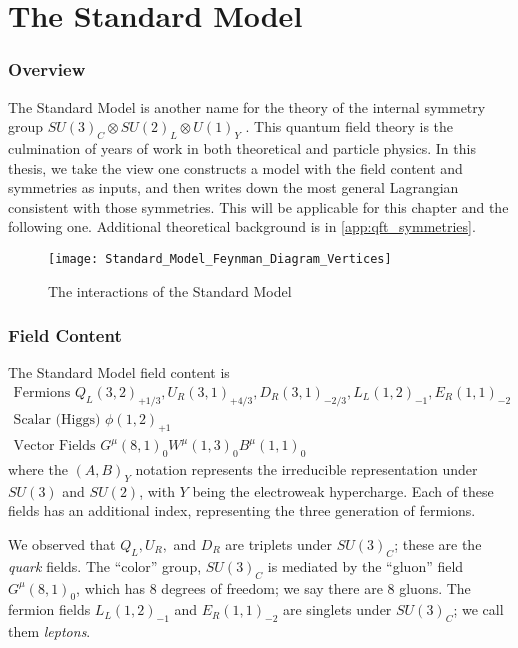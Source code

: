 \chapter{The Standard Model}

\subsection{Overview}


The Standard Model is another name for the theory of the internal symmetry group $SU(3)_C \otimes SU(2)_L \otimes U(1)_Y$ .
This quantum field theory is the culmination of years of work in both theoretical and particle physics.  
In this thesis, we take the view one constructs a model with the field content and symmetries as inputs, and then writes down the most general Lagrangian consistent with those symmetries.
This will be applicable for this chapter and the following one.
Additional theoretical background is in \ref{app:qft_symmetries}.

\begin{figure}
\caption{The interactions of the Standard Model}
\texttt{[image: Standard\_Model\_Feynman\_Diagram\_Vertices]}
\end{figure}

\subsection{Field Content}

The Standard Model field content is
\begin{equation}
\begin{aligned}
\text{Fermions } Q_L(3,2)_{+1/3}, \xspace  U_R(3,1)_{+4/3},\xspace  D_R(3,1)_{-2/3} ,\xspace  L_L(1,2)_{-1} ,\xspace  E_R(1,1)_{-2}\\
\text{Scalar (Higgs) } \xspace \phi(1,2)_{+1} \\
\text{Vector Fields } \xspace G^\mu(8,1)_0 \xspace W^\mu(1,3)_0  \xspace B^\mu(1,1)_0
\end{aligned}
\end{equation}
where the $(A, B)_Y$ notation represents the irreducible representation under $SU(3)$ and $SU(2)$, with $Y$ being the electroweak hypercharge.
Each of these fields has an additional index, representing the three generation of fermions.

We observed that $Q_L, U_R,$ and $D_R$ are triplets under $SU(3)_C$; these are the \textit{quark} fields.
The ``color'' group, $SU(3)_C$ is mediated by the ``gluon'' field $G^\mu(8,1)_0$, which has 8 degrees of freedom; we say there are 8 gluons.
The fermion fields $L_L(1,2)_{-1}$ and $  E_R(1,1)_{-2} $ are singlets under $SU(3)_C$; we call them \textit{leptons}.

